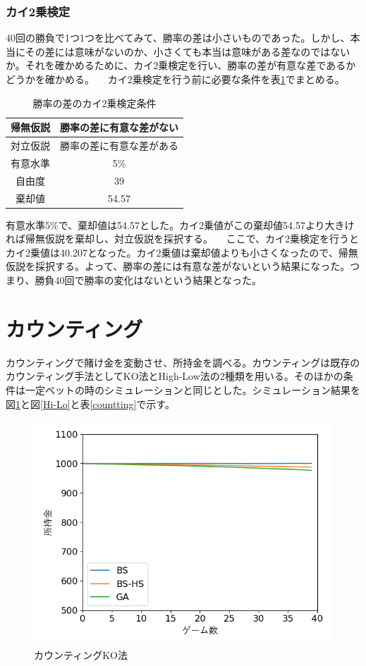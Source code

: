 \subsubsection{カイ2乗検定}
40回の勝負で1つ1つを比べてみて、勝率の差は小さいものであった。しかし、本当にその差には意味がないのか、小さくても本当は意味がある差なのではないか。それを確かめるために、カイ2乗検定を行い、勝率の差が有意な差であるかどうかを確かめる。
　カイ2乗検定を行う前に必要な条件を表\ref{win-x}でまとめる。
\begin{table}[H]
 \caption{勝率の差のカイ2乗検定条件\label{win-x}}
 \begin{center}
  \begin{tabular}{|c|c|}
  \hline 帰無仮説 & 勝率の差に有意な差がない \\
  \hline 対立仮説 & 勝率の差に有意な差がある \\
  \hline 有意水準 & 5\% \\
  \hline 自由度 & 39 \\
  \hline 棄却値 & 54.57\\
  \hline
  \end{tabular}
 \end{center}
\end{table}
有意水準5\%で、棄却値は54.57とした。カイ2乗値がこの棄却値54.57より大きければ帰無仮説を棄却し、対立仮説を採択する。
　ここで、カイ2乗検定を行うとカイ2乗値は40.207となった。カイ2乗値は棄却値よりも小さくなったので、帰無仮説を採択する。よって、勝率の差には有意な差がないという結果になった。つまり、勝負40回で勝率の変化はないという結果となった。

\section{カウンティング}
カウンティングで賭け金を変動させ、所持金を調べる。カウンティングは既存のカウンティング手法としてKO法とHigh-Low法の2種類を用いる。そのほかの条件は一定ベットの時のシミュレーションと同じとした。シミュレーション結果を図\ref{KO}と図\ref{Hi-Lo}と表\ref{countting}で示す。
\begin{figure}[H]
 \begin{center} 
  \includegraphics[width=0.7\linewidth]{./figure/betsimulation-KO}
  \caption{カウンティングKO法\label{KO}}
 \end{center}
\end{figure}

